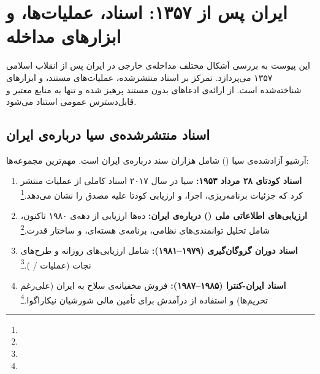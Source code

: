 \chapter{ایران پس از ۱۳۵۷: اسناد، عملیات‌ها، و ابزارهای مداخله}
\label{app:iran-post1979}

\begin{tcolorbox}[mybox, title={درباره‌ی این پیوست}]
این پیوست به بررسی اَشکال مختلف مداخله‌ی خارجی در ایران پس از انقلاب اسلامی ۱۳۵۷ می‌پردازد. تمرکز بر اسناد منتشرشده، عملیات‌های مستند، و ابزارهای شناخته‌شده است. از ارائه‌ی ادعاهای بدون مستند پرهیز شده و تنها به منابع معتبر و قابل‌دسترس عمومی استناد می‌شود.
\end{tcolorbox}

\section{اسناد منتشرشده‌ی سیا درباره‌ی ایران}
\label{sec:app-c-cia}

آرشیو آزادشده‌ی سیا () شامل هزاران سند درباره‌ی ایران است. مهم‌ترین مجموعه‌ها:

\begin{enumerate}
\item \textbf{اسناد کودتای ۲۸ مرداد ۱۹۵۳:} سیا در سال ۲۰۱۷ اسناد کاملی از عملیات  منتشر کرد که جزئیات برنامه‌ریزی، اجرا، و ارزیابی کودتا علیه مصدق را نشان می‌دهد.\footnote{}

\item \textbf{ارزیابی‌های اطلاعاتی ملی () درباره‌ی ایران:} ده‌ها ارزیابی از دهه‌ی ۱۹۸۰ تاکنون، شامل تحلیل توانمندی‌های نظامی، برنامه‌ی هسته‌ای، و ساختار قدرت.\footnote{}

\item \textbf{اسناد دوران گروگان‌گیری (۱۹۷۹–۱۹۸۱):} شامل ارزیابی‌های روزانه و طرح‌های نجات (عملیات  / ).\footnote{}

\item \textbf{اسناد ایران-کنترا (۱۹۸۵–۱۹۸۷):} فروش مخفیانه‌ی سلاح به ایران (علی‌رغم تحریم‌ها) و استفاده از درآمدش برای تأمین مالی شورشیان نیکاراگوا.\footnote{}
\end{enumerate}

